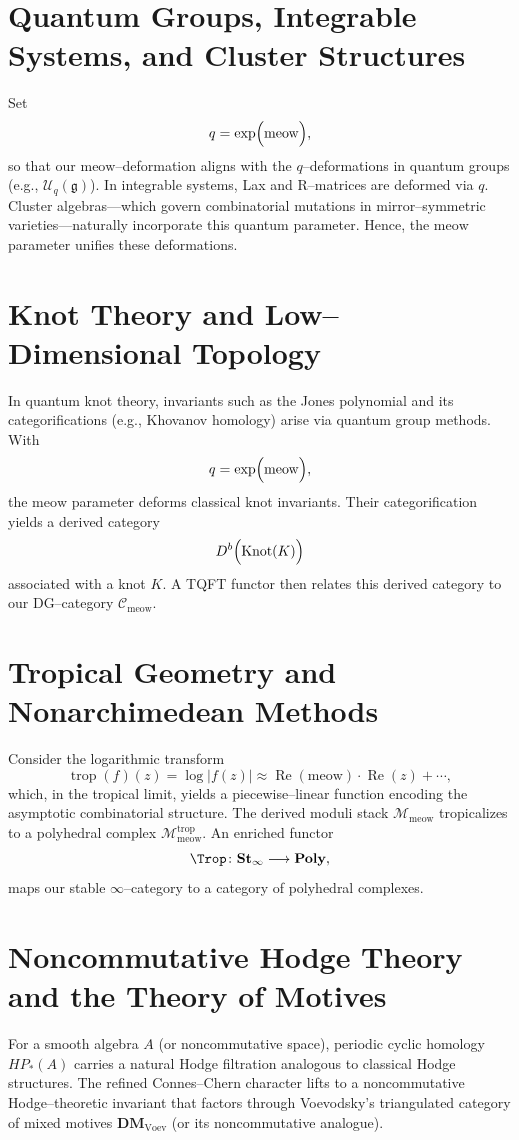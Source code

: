 \documentclass[11pt,a4paper]{article}
\newcommand{\meow}{\mathrm{meow}}
\newcommand{\Mmeow}{\mathcal{M}_{\meow}}
\newcommand{\Cmeow}{\mathcal{C}_{\meow}}
\theoremstyle{plain}
\theoremstyle{definition}
\theoremstyle{remark}
\begin{document}
\section{Quantum Groups, Integrable Systems, and Cluster Structures}
Set
\[
    q=\exp\Bigl(\meow\Bigr),
\]
so that our \(\meow\)–deformation aligns with the \(q\)–deformations in quantum groups (e.g., \(\mathcal{U}_q(\mathfrak{g})\)). In integrable systems, Lax and R–matrices are deformed via \(q\). Cluster algebras—which govern combinatorial mutations in mirror–symmetric varieties—naturally incorporate this quantum parameter. Hence, the \(\meow\) parameter unifies these deformations.

\section{Knot Theory and Low--Dimensional Topology}
In quantum knot theory, invariants such as the Jones polynomial and its categorifications (e.g., Khovanov homology) arise via quantum group methods. With
\[
    q=\exp\Bigl(\meow\Bigr),
\]
the \(\meow\) parameter deforms classical knot invariants. Their categorification yields a derived category
\[
    D^b\Bigl(\operatorname{Knot}(K)\Bigr)
\]
associated with a knot \(K\). A TQFT functor then relates this derived category to our DG–category \(\Cmeow\).

\section{Tropical Geometry and Nonarchimedean Methods}
Consider the logarithmic transform
\[
    \operatorname{trop}(f)(z)=\log\bigl|f(z)\bigr| \approx \operatorname{Re}(\meow)\cdot \operatorname{Re}(z)+\cdots,
\]
which, in the tropical limit, yields a piecewise–linear function encoding the asymptotic combinatorial structure. The derived moduli stack \(\Mmeow\) tropicalizes to a polyhedral complex \(\Mmeow^{\mathrm{trop}}\). An enriched functor
\[
    \Trop\colon \mathbf{St}_\infty \longrightarrow \mathbf{Poly},
\]
maps our stable \(\infty\)–category to a category of polyhedral complexes.

\section{Noncommutative Hodge Theory and the Theory of Motives}
For a smooth algebra \(A\) (or noncommutative space), periodic cyclic homology \(HP_*(A)\) carries a natural Hodge filtration analogous to classical Hodge structures. The refined Connes--Chern character lifts to a noncommutative Hodge–theoretic invariant that factors through Voevodsky’s triangulated category of mixed motives \(\mathbf{DM}_{\mathrm{Voev}}\) (or its noncommutative analogue).
\end{document}
